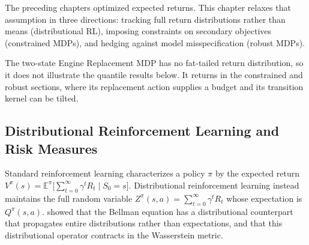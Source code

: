 
The preceding chapters optimized expected returns. This chapter relaxes
that assumption in three directions: tracking full return distributions
rather than means (distributional RL), imposing constraints on secondary
objectives (constrained MDPs), and hedging against model misspecification
(robust MDPs).

The two-state Engine Replacement MDP has no fat-tailed return distribution, so it does not illustrate the quantile results below. It returns in the constrained and robust sections, where its replacement action supplies a budget and its transition kernel can be tilted.



\subsection{Distributional Reinforcement Learning and Risk Measures}
\label{subsec:distributional_rl}

Standard reinforcement learning characterizes a policy $\pi$ by the
expected return $V^\pi(s) = \mathbb{E}^\pi\bigl[\sum_{t=0}^\infty \gamma^t
R_t \mid S_0 = s\bigr]$. Distributional reinforcement learning instead
maintains the full random variable $Z^\pi(s,a) = \sum_{t=0}^\infty \gamma^t
R_t$ whose expectation is $Q^\pi(s,a)$. \citet{Bellemare2017} showed that
the Bellman equation has a distributional counterpart that propagates entire
distributions rather than expectations, and that this distributional operator
contracts in the Wasserstein metric.

